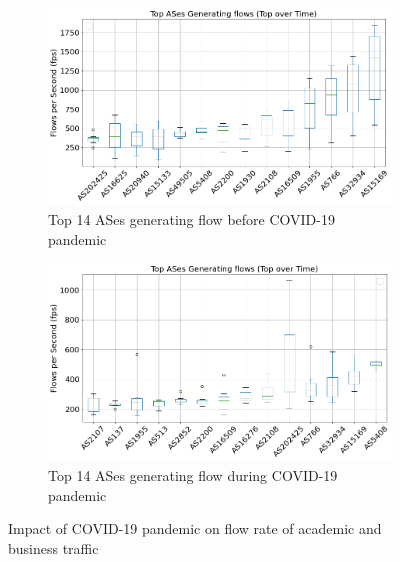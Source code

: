 \documentclass[10pt, journal, letterpaper]{IEEEtran}
\newcommand\figSzeMahdi{0.8}
\begin{document}
\begin{figure}
    \begin{subfigure}{\figSzeMahdi\columnwidth}
          \centering
          \includegraphics[width=\columnwidth]{img/BCO2_top14AS_generating_fps.png}
          \caption{Top 14 ASes generating flow before COVID-19 pandemic}
          \label{fig:BCO2_topAS_gen_fps}
    \end{subfigure}
    \begin{subfigure}{\figSzeMahdi\columnwidth}
          \centering
          \includegraphics[width=\columnwidth]{img/CO2_top14AS_generating_fps.png}
          \caption{Top 14 ASes generating flow during COVID-19 pandemic}
          \label{fig:Co2_topAS_gen_fps}
    \end{subfigure}
    \caption{Impact of COVID-19 pandemic on flow rate of academic and business traffic}
    \label{fig:flowrate_topAS_gen_BCO_CO}
\end{figure}
\end{document}
